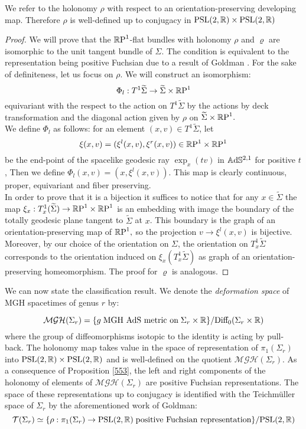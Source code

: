 \begin{observation}
We refer to the holonomy $\rho$ with respect to an orientation-preserving developing map. Therefore $\rho$ is well-defined up to conjugacy in $\text{PSL}(2,\R)\times\text{PSL}(2,\R)$
\end{observation}
\begin{proof}
    We will prove that the $\S$-flat bundles with holonomy $\rho$ and $\varrho$ are isomorphic to the unit tangent bundle of $\Sigma.$ The condition is equivalent to the representation being positive Fuchsian due to a result of Goldman \cite{goldman1980discontinuous}. For the sake of definiteness, let us focus on $\rho$. We will construct an isomorphism: 
    \[
        \Phi_l:T^1\widetilde{\Sigma}\to \widetilde{\Sigma}\times\S
    \]
    equivariant with the respect to the action on $T^1\widetilde{\Sigma}$ by the actions by deck transformation and the diagonal action given by $\rho$ on $\widetilde{\Sigma}\times\S.$ \\
    We define $\Phi_l$ as follows: for an element $(x,v)\in T^1\widetilde{\Sigma}$, let 
    \[
        \xi(x,v)=(\xi^l(x,v),\xi^r(x,v))\in \T
    \]
    be the end-point of the spacelike geodesic ray $\exp_x(tv)$ in $\A^{2,1}$ for positive $t$, Then we define $\Phi_l(x,v)=(x,\xi^l(x,v)).$ This map is clearly continuous, proper, equivariant and fiber preserving. \\
    In order to prove that it is a bijection it suffices to notice that for any $x\in\widetilde{\Sigma}$ the map $\xi_x:T_x^1(\widetilde{\Sigma})\to\T$ is an embedding with image the boundary of the totally geodesic plane tangent to $\widetilde{\Sigma}$ at $x$. This boundary is the graph of an orientation-preserving map of $\S,$ so the projection $v\to\xi^l(x,v)$ is bijective. Moreover, by our choice of the orientation on $\Sigma$, the orientation on $T_x^1\widetilde{\Sigma}$ corresponds to the orientation induced on $\xi_x(T^1_x\widetilde{\Sigma})$ as graph of an orientation-preserving homeomorphism. The proof for $\varrho$ is analogous.
\end{proof}


We can now state the classification result. We denote the \textit{deformation space} of MGH spacetimes of genus $r$ by:

\[
    \mathcal{MGH}(\Sigma_r)=\{g\;\text{MGH AdS metric on}\;\Sigma_r\times\R\}/\text{Diff}_0(\Sigma_r\times\R)
\]
where the group of diffeomorphisms isotopic to the identity is acting by pull-back. The holonomy map takes value in the space of representation of $\pi_1(\Sigma_r)$ into $\PSL\times\PSL$ and is well-defined on the quotient $ \mathcal{MGH}(\Sigma_r).$
As a consequence of Proposition \ref{553}, the left and right components of the holonomy of elements of $ \mathcal{MGH}(\Sigma_r)$ are positive Fuchsian representations. The space of these representations up to conjugacy is identified with the Teichm\"uller space of $\Sigma_r$ by the aforementioned work of Goldman:
\[
    \mathcal{T}(\Sigma_r)\simeq\{\rho:\pi_1(\Sigma_r)\to\PSL\;\text{positive Fuchsian representation}\}/\PSL
\]

